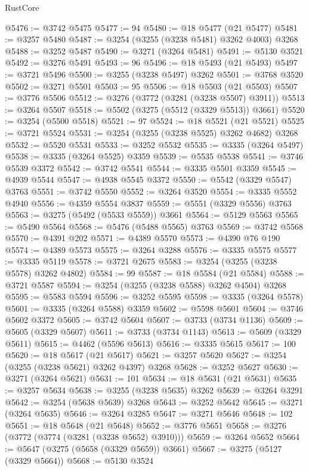\begin{lexlean}{RustCore}
\begin{coremodule}
@5476 := @3742 @5475
@5477 := 94
@5480 := @18 @5477 (@21 @5477)
@5481 := @3257 @5480
@5487 := @3254 (@3255 (@3238 @5481) @3262 @4003) @3268
@5488 := @3252 @5487
@5490 := @3271 (@3264 @5481)
@5491 := @5130 @3521
@5492 := @3276 @5491
@5493 := 96
@5496 := @18 @5493 (@21 @5493)
@5497 := @3721 @5496
@5500 := @3255 (@3238 @5497) @3262
@5501 := @3768 @3520
@5502 := @3271 @5501
@5503 := 95
@5506 := @18 @5503 (@21 @5503)
@5507 := @3776 @5506
@5512 := @3276 (@3772 (@3281 (@3238 @5507) @3911))
@5513 := @3264 @5507
@5518 := @5502 (@3275 (@5512 (@3329 @5513)) @3661)
@5520 := @3254 (@5500 @5518)
@5521 := 97
@5524 := @18 @5521 (@21 @5521)
@5525 := @3721 @5524
@5531 := @3254 (@3255 (@3238 @5525) @3262 @4682) @3268
@5532 := @5520 @5531
@5533 := @3252 @5532
@5535 := @3335 (@3264 @5497)
@5538 := @3335 (@3264 @5525) @3359
@5539 := @5535 @5538
@5541 := @3746 @5539 @3372
@5542 := @3742 @5541
@5544 := @3335 @5501 @3359
@5545 := @4939 @5544
@5547 := @4938 @5545 @3372
@5550 := @5542 (@3329 @5547) @3763
@5551 := @3742 @5550
@5552 := @3264 @3520
@5554 := @3335 @5552 @4940
@5556 := @4359 @5554 @3837
@5559 := @5551 (@3329 @5556) @3763
@5563 := @3275 (@5492 (@5533 @5559)) @3661
@5564 := @5129 @5563
@5565 := @5490 @5564
@5568 := @5476 (@5488 @5565) @3763
@5569 := @3742 @5568
@5570 := @4391 @202
@5571 := @4389 @5570
@5573 := @4390 @76 @190
@5574 := @4389 @5573
@5575 := @3264 @3288
@5576 := @3335 @5575
@5577 := @3335 @5119
@5578 := @3721 @2675
@5583 := @3254 (@3255 (@3238 @5578) @3262 @4802)
@5584 := 99
@5587 := @18 @5584 (@21 @5584)
@5588 := @3721 @5587
@5594 := @3254 (@3255 (@3238 @5588) @3262 @4504) @3268
@5595 := @5583 @5594
@5596 := @3252 @5595
@5598 := @3335 (@3264 @5578)
@5601 := @3335 (@3264 @5588) @3359
@5602 := @5598 @5601
@5604 := @3746 @5602 @3372
@5605 := @3742 @5604
@5607 := @3733 (@3734 @1136)
@5609 := @5605 (@3329 @5607)
@5611 := @3733 (@3734 @1143)
@5613 := @5609 (@3329 @5611)
@5615 := @4462 (@5596 @5613)
@5616 := @3335 @5615
@5617 := 100
@5620 := @18 @5617 (@21 @5617)
@5621 := @3257 @5620
@5627 := @3254 (@3255 (@3238 @5621) @3262 @4397) @3268
@5628 := @3252 @5627
@5630 := @3271 (@3264 @5621)
@5631 := 101
@5634 := @18 @5631 (@21 @5631)
@5635 := @3257 @5634
@5638 := @3255 (@3238 @5635) @3262
@5639 := @3264 @3291
@5642 := @3254 (@5638 @5639) @3268
@5643 := @3252 @5642
@5645 := @3271 (@3264 @5635)
@5646 := @3264 @3285
@5647 := @3271 @5646
@5648 := 102
@5651 := @18 @5648 (@21 @5648)
@5652 := @3776 @5651
@5658 := @3276 (@3772 (@3774 (@3281 (@3238 @5652) @3910)))
@5659 := @3264 @5652
@5664 := @5647 (@3275 (@5658 (@3329 @5659)) @3661)
@5667 := @3275 (@5127 (@3329 @5664))
@5668 := @5130 @3524

\end{coremodule}
\end{lexlean}
